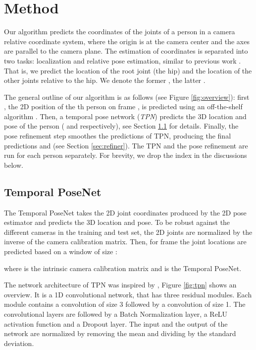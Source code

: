 \documentclass[runningheads, envcountsame, a4paper]{llncs}
\begin{document}
\section{Method}
Our algorithm predicts the coordinates of the joints of a person in a camera relative coordinate system, where the origin is at the camera center and the axes are parallel to the camera plane. The estimation of coordinates is separated into two tasks: localization and relative pose estimation, similar to previous work \cite{veges2019depthpose,moon2019camdistance}. That is, we predict the location of the root joint (the hip) and the location of the other joints relative to the hip. We denote the former , the latter .

The general outline of our algorithm is as follows (see Figure \ref{fig:overview}): first , the 2D position of the th person on frame , is predicted using an off-the-shelf algorithm \cite{hrnet}. Then, a temporal pose network (\textit{TPN}) predicts the 3D location and pose of the person ( and  respectively), see Section \ref{sec:tpn} for details. Finally, the pose refinement step smoothes the predictions of TPN, producing the final predictions  and  (see Section \ref{sec:refiner}). The TPN and the pose refinement are run for each person separately. For brevity, we drop the index  in the discussions below.

\subsection{Temporal PoseNet} \label{sec:tpn}
The Temporal PoseNet takes the 2D joint coordinates produced by the 2D pose estimator and predicts the 3D location and pose. To be robust against the different cameras in the training and test set, the 2D joints are normalized by the inverse of the camera calibration matrix. Then, for frame  the joint locations are predicted based on a window of size :

where  is the intrinsic camera calibration matrix and  is the Temporal PoseNet. 

The network architecture of TPN was inspired by \cite{pavllo2019videopose3d}, Figure \ref{fig:tpn} shows an overview. It is a 1D convolutional network, that has three residual modules. Each module contains a convolution of size 3 followed by a convolution of size 1. The convolutional layers are followed by a Batch Normalization layer, a ReLU activation function and a Dropout layer. The input and the output of the network are normalized by removing the mean and dividing by the standard deviation.
\end{document}

